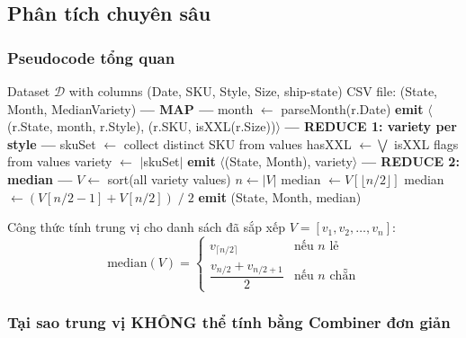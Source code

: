 \subsection{Phân tích chuyên sâu}

\subsubsection{Pseudocode tổng quan}

\begin{algorithm}[H]
\caption{State-level Median Variety per Month (Two-pass MapReduce)}
\label{alg:task1_2}
\begin{algorithmic}[1]
\Require Dataset $\mathcal{D}$ with columns (Date, SKU, Style, Size, ship-state)
\Ensure CSV file: (State, Month, MedianVariety)
\Statex
\Statex \textbf{--- MAP ---}
    \State month $\gets$ parseMonth(r.Date) 
    \State \textbf{emit} $\langle$(r.State, month, r.Style), (r.SKU, isXXL(r.Size))$\rangle$
\EndFor
\Statex
\Statex \textbf{--- REDUCE 1: variety per style ---}
    \State skuSet $\gets$ collect distinct SKU from values
    \State hasXXL $\gets \bigvee$ isXXL flags from values
    \State variety $\gets$ $|$skuSet$|$
        \State \textbf{emit} $\langle$(State, Month), variety$\rangle$
    \EndIf
\EndFor
\Statex
\Statex \textbf{--- REDUCE 2: median ---}
    \State $V \gets$ sort(all variety values)
    \State $n \gets |V|$
        \State median $\gets V[\lfloor n/2 \rfloor]$
    \Else
        \State median $\gets (V[n/2 - 1] + V[n/2]) \;/\; 2$
    \EndIf
    \State \textbf{emit} (State, Month, median)
\EndFor
\end{algorithmic}
\end{algorithm}

Công thức tính trung vị cho danh sách đã sắp xếp $V = [v_1, v_2, \ldots, v_n]$:
\[
\text{median}(V) = \begin{cases}
v_{\lceil n/2 \rceil} & \text{nếu } n \text{ lẻ} \\[4pt]
\dfrac{v_{n/2} + v_{n/2+1}}{2} & \text{nếu } n \text{ chẵn}
\end{cases}
\]

\subsubsection{Tại sao trung vị KHÔNG thể tính bằng Combiner đơn giản}

